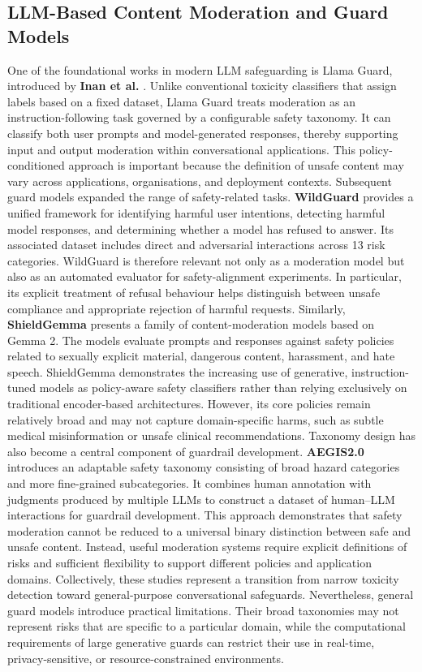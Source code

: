 \documentclass[11pt,a4paper]{article}
\begin{document}
\subsection{LLM-Based Content Moderation and Guard Models}
One of the foundational works in modern LLM safeguarding is Llama Guard, introduced by \textbf{Inan et al.} \cite{inan2023llamaguard}. Unlike conventional toxicity classifiers that assign labels based on a fixed dataset, Llama Guard treats moderation as an instruction-following task governed by a configurable safety taxonomy. It can classify both user prompts and model-generated responses, thereby supporting input and output moderation within conversational applications. This policy-conditioned approach is important because the definition of unsafe content may vary across applications, organisations, and deployment contexts.
Subsequent guard models expanded the range of safety-related tasks. \textbf{WildGuard} \cite{han2024wildguard} provides a unified framework for identifying harmful user intentions, detecting harmful model responses, and determining whether a model has refused to answer. Its associated dataset includes direct and adversarial interactions across 13 risk categories. WildGuard is therefore relevant not only as a moderation model but also as an automated evaluator for safety-alignment experiments. In particular, its explicit treatment of refusal behaviour helps distinguish between unsafe compliance and appropriate rejection of harmful requests.
Similarly, \textbf{ShieldGemma} \cite{zeng2024shieldgemma} presents a family of content-moderation models based on Gemma 2. The models evaluate prompts and responses against safety policies related to sexually explicit material, dangerous content, harassment, and hate speech. ShieldGemma demonstrates the increasing use of generative, instruction-tuned models as policy-aware safety classifiers rather than relying exclusively on traditional encoder-based architectures. However, its core policies remain relatively broad and may not capture domain-specific harms, such as subtle medical misinformation or unsafe clinical recommendations.
Taxonomy design has also become a central component of guardrail development. \textbf{AEGIS2.0} \cite{ghosh2025aegis} introduces an adaptable safety taxonomy consisting of broad hazard categories and more fine-grained subcategories. It combines human annotation with judgments produced by multiple LLMs to construct a dataset of human–LLM interactions for guardrail development. This approach demonstrates that safety moderation cannot be reduced to a universal binary distinction between safe and unsafe content. Instead, useful moderation systems require explicit definitions of risks and sufficient flexibility to support different policies and application domains.
Collectively, these studies represent a transition from narrow toxicity detection toward general-purpose conversational safeguards. Nevertheless, general guard models introduce practical limitations. Their broad taxonomies may not represent risks that are specific to a particular domain, while the computational requirements of large generative guards can restrict their use in real-time, privacy-sensitive, or resource-constrained environments.
\end{document}
